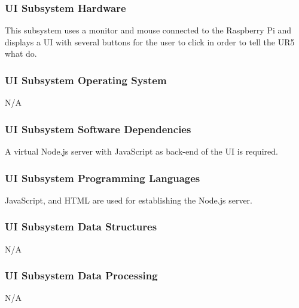 \subsubsection{UI Subsystem Hardware}
This subsystem uses a monitor and mouse connected to the Raspberry Pi and displays a UI with several buttons for the user to click in order to tell the UR5 what do.

\subsubsection{UI Subsystem Operating System}
N/A

\subsubsection{UI Subsystem Software Dependencies}
A virtual Node.js server with JavaScript as back-end of the UI is required.

\subsubsection{UI Subsystem Programming Languages}
JavaScript, and HTML are used for establishing the Node.js server. 

\subsubsection{UI Subsystem Data Structures}
N/A

\subsubsection{UI Subsystem Data Processing}
N/A
